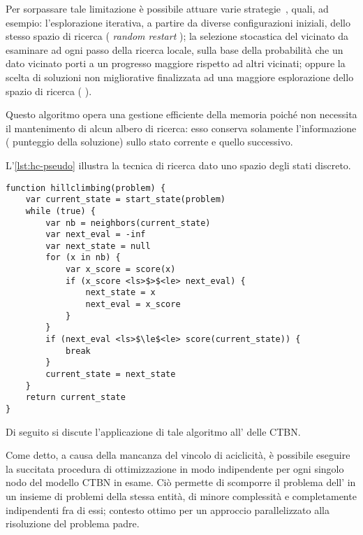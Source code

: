 Per sorpassare tale limitazione è possibile attuare varie strategie~\citep[si veda][]{Russel2003}, quali, ad esempio: l'esplorazione iterativa, a partire da diverse configurazioni iniziali, dello stesso spazio di ricerca (\ie{} \emph{random restart} \emph{\keyword{\hc{}}}); la selezione stocastica del vicinato da esaminare ad ogni passo della ricerca locale, sulla base della probabilità che un dato vicinato porti a un progresso maggiore rispetto ad altri vicinati; oppure la scelta di soluzioni non migliorative finalizzata ad una maggiore esplorazione dello spazio di ricerca (\ie{} \emph{}).

\begin{notas}
Questo algoritmo opera una gestione efficiente della memoria poiché non necessita il mantenimento di alcun albero di ricerca: esso conserva solamente l'informazione (\ie{} punteggio della soluzione) sullo stato corrente e quello successivo.
\end{notas}

L'\autoref{lst:hc-pseudo} illustra la tecnica di ricerca \emph{\keyword{\hc{}}} dato uno spazio degli stati discreto.
\vspace*{8pt}\begin{lstlisting}[language=pseudo, label=lst:hc-pseudo, caption={[Algoritmo \emph{\hc{}}]Algoritmo \emph{\hc{}} per uno spazio degli stati discreto.}]
function hillclimbing(problem) {
    var current_state = start_state(problem)
    while (true) {
        var nb = neighbors(current_state)
        var next_eval = -inf
        var next_state = null
        for (x in nb) {
            var x_score = score(x)
            if (x_score <ls>$>$<le> next_eval) {
                next_state = x
                next_eval = x_score
            }
        }
        if (next_eval <ls>$\le$<le> score(current_state)) {
            break
        }
        current_state = next_state
    }
    return current_state
}
\end{lstlisting}

Di seguito si discute l'applicazione di tale algoritmo all' delle \acs{CTBN}.

Come detto, a causa della mancanza del vincolo di aciclicità, è possibile eseguire la succitata procedura di ottimizzazione in modo indipendente per ogni singolo nodo del modello \acs{CTBN} in esame. Ciò permette di scomporre il problema dell' in un insieme di problemi della stessa entità, di minore complessità e completamente indipendenti fra di essi; contesto ottimo per un approccio parallelizzato alla risoluzione del problema padre.

